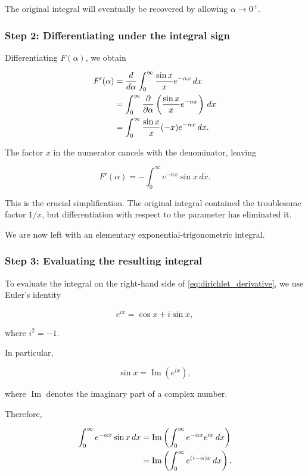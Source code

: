 \documentclass[11pt,a4paper]{article}
\theoremstyle{definition}
\theoremstyle{remark}
\begin{document}
The original integral will eventually
be recovered by allowing
$\alpha\to0^+$.

\subsubsection*{Step 2: Differentiating under the integral sign}

Differentiating $F(\alpha)$,
we obtain

\begin{align}
    F'(\alpha)
    &=
    \frac{d}{d\alpha}
    \int_0^\infty
    \frac{\sin x}{x}e^{-\alpha x}\,dx
    \notag\\
    &=
    \int_0^\infty
    \frac{\partial}{\partial\alpha}
    \left(
    \frac{\sin x}{x}e^{-\alpha x}
    \right)\,dx
    \notag\\
    &=
    \int_0^\infty
    \frac{\sin x}{x}
    (-x)e^{-\alpha x}\,dx.
\end{align}

The factor $x$ in the numerator
cancels with the denominator,
leaving

\begin{equation}
    \boxed{
    F'(\alpha)
    =
    -\int_0^\infty
    e^{-\alpha x}\sin x\,dx.
    }
    \label{eq:dirichlet_derivative}
\end{equation}

This is the crucial simplification.
The original integral contained
the troublesome factor $1/x$,
but differentiation with respect
to the parameter has eliminated it.

We are now left with an elementary
exponential-trigonometric integral.

\subsubsection*{Step 3: Evaluating the resulting integral}

To evaluate the integral on the
right-hand side of
\eqref{eq:dirichlet_derivative},
we use Euler's identity

\[
    e^{ix}=\cos x+i\sin x,
\]

where $i^2=-1$.

In particular,

\[
    \sin x=\operatorname{Im}(e^{ix}),
\]

where $\operatorname{Im}$ denotes
the imaginary part of a complex
number.

Therefore,

\begin{align}
    \int_0^\infty
    e^{-\alpha x}\sin x\,dx
    &=
    \operatorname{Im}
    \left(
    \int_0^\infty
    e^{-\alpha x}e^{ix}\,dx
    \right)
    \notag\\
    &=
    \operatorname{Im}
    \left(
    \int_0^\infty
    e^{(i-\alpha)x}\,dx
    \right).
\end{align}
\end{document}
